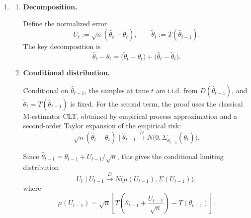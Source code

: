 \documentclass[../../../main.tex]{subfiles}
\begin{document}
\begin{msbproblem}
\begin{answerkey}
\begin{enumerate}
\[
\begin{aligned}
&
\widehat{\mathcal{L}}(\theta,\widehat\theta_{t-1})
-
\widehat{\mathcal{L}}(T(\widehat\theta_{t-1}),\widehat\theta_{t-1}) \\
\ge&
    \frac{\|\theta-T(\widehat\theta_{t-1})\|}
    {\|\omega-T(\widehat\theta_{t-1})\|}
    \left(
        \widehat{\mathcal{L}}(\omega,\widehat\theta_{t-1})
        -
        \widehat{\mathcal{L}}(T(\widehat\theta_{t-1}),\widehat\theta_{t-1})
    \right) \\
\ge&
    \frac{\|\theta-T(\widehat\theta_{t-1})\|}{\varepsilon_0}
    \bigl(\delta-o_P(1)\bigr)
    \ge
    \delta-o_P(1),
\end{aligned}
\]
Thus, no $\theta$ such that
$\|\theta-T(\widehat\theta_{t-1})\|\ge\varepsilon_0$ can be the minimizer of
$\widehat{\mathcal{L}}(\theta,\widehat\theta_{t-1})$, so
\[
    \|T(\widehat\theta_{t-1})-\widehat T(\widehat\theta_{t-1})\|
    \xrightarrow{P}0.
\]
For all $t \geq 1$, we have
\[
    \|\widehat\theta_t-\theta_t\|
    \le
    \sum_{i=0}^{t}
    \left(\frac{\varepsilon\beta}{\gamma}\right)^{t-i}
    \|T(\widehat\theta_i)-\widehat T(\widehat\theta_i)\|
    \xrightarrow{P}0.
\]

    \item 
\begin{enumerate}
    \item \textbf{Decomposition.}

    Define the normalized error
    \[
        U_t := \sqrt{n}(\widehat\theta_t-\theta_t),
        \qquad
        \widetilde\theta_t := T(\widehat\theta_{t-1}).
    \]
    The key decomposition is
    \[
        \widehat\theta_t-\theta_t
        =
        \bigl(\widetilde\theta_t-\theta_t\bigr)
        +
        \bigl(\widehat\theta_t-\widetilde\theta_t\bigr).
    \]

    \item \textbf{Conditional distribution.}

    Conditional on $\widehat\theta_{t-1}$, the samples at time $t$ are i.i.d.
    from $D(\widehat\theta_{t-1})$, and
    $\widetilde\theta_t=T(\widehat\theta_{t-1})$ is fixed. For the second term, the proof uses the classical M-estimator CLT, obtained
    by empirical process approximation and a second-order Taylor expansion of
    the empirical risk:
    \[
        \sqrt{n}(\widehat\theta_t-\widetilde\theta_t)
        \mid \widehat\theta_{t-1}
        \xrightarrow{D}
        N\bigl(0,\Sigma_{\widehat\theta_{t-1}}(\widetilde\theta_t)\bigr).
    \]

    Since
    $\widehat\theta_{t-1}=\theta_{t-1}+U_{t-1}/\sqrt{n}$, this gives the
    conditional limiting distribution
    \[
        U_t\mid U_{t-1}
        \xrightarrow{D}
        N\bigl(\mu(U_{t-1}),\Sigma(U_{t-1})\bigr),
    \]
    where
    \[
        \mu(U_{t-1})
        =
        \sqrt{n}\left[
        T\left(\theta_{t-1}+\frac{U_{t-1}}{\sqrt{n}}\right)
        -
        T(\theta_{t-1})
        \right].
    \]


\end{enumerate}
\end{enumerate}
\end{answerkey}
\end{msbproblem}
\end{document}
